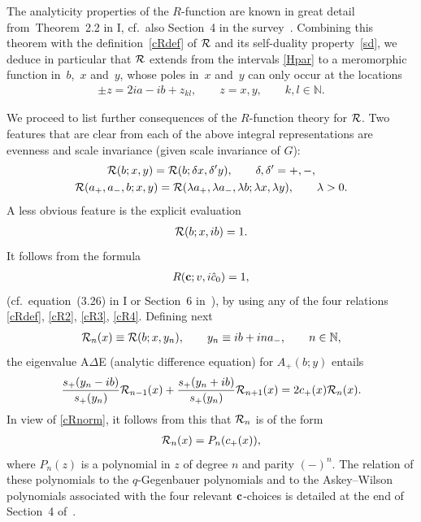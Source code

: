 \documentclass[11pt]{article}
\numberwithin{equation}{section}
\newcommand{\De}{\Delta}
\newcommand{\de}{\delta}
\newcommand{\N}{{\mathbb N}}
\newcommand{\cR}{{\cal R}}
\newcommand{\aaa}{a_{+},a_{-}}
\begin{document}
The analyticity properties of the $R$-function are known in great detail from~Theorem~2.2 in I, cf.~also Section~4 in the survey~\cite{Rsurv}. Combining this theorem with the def\/inition~\eqref{cRdef} of $\cR$ and its self-duality property~\eqref{sd}, we deduce in particular that $\cR$ extends from the intervals \eqref{Hpar} to a meromorphic function in~$b$,~$x$ and~$y$, whose poles in~$x$ and~$y$ can only occur at the locations
\begin{gather}\label{cRpoles}
\pm z=2ia-ib+z_{kl},\qquad  z=x,y,\qquad k,l\in \N.
\end{gather}

We proceed to list further consequences of the $R$-function theory for $\cR$. Two features that are clear from each of the above integral representations are evenness and scale invariance (given scale invariance of $G$):
\begin{gather}\label{even}
\cR (b;x,y)=\cR(b;\de x, \de'y),\qquad \de,\de'=+,-,
\\
\label{scale}
\cR(\aaa,b;x,y)=\cR(\lambda  a_{+},\lambda a_{-}, \lambda b;\lambda x,\lambda y),\qquad \lambda>0.
\end{gather}
A less obvious feature is the explicit evaluation
\begin{gather}\label{cRnorm}
\cR(b;x,ib)=1.
\end{gather}
It follows from the formula
\begin{gather}
R({\bf c};v,i\hat{c}_0)=1,
\end{gather}
(cf.~equation~(3.26) in I or Section~6 in~\cite{Rsurv}), by using any of the four relations \eqref{cRdef}, \eqref{cR2}, \eqref{cR3}, \eqref{cR4}.
Def\/ining next
\begin{gather}
\cR_n(x)\equiv \cR(b;x,y_n),\qquad y_n\equiv ib+ina_{-},\qquad n\in\N,
\end{gather}
the eigenvalue A$\De$E (analytic dif\/ference equation) for $A_{+}(b;y)$ entails
\begin{gather}
 \frac{s_{+}(y_n-ib)}{s_{+}(y_n)}\cR_{n-1}(x)+\frac{s_{+}(y_n+ib)}{s_{+}(y_n)}\cR_{n+1}(x)=2c_{+}(x)\cR_n(x).
\end{gather}
In view of \eqref{cRnorm}, it follows from this that $\cR_n$ is of the form
\begin{gather}\label{qGeg}
\cR_n(x)=P_n(c_{+}(x)),
\end{gather}
where $P_n(z)$ is a polynomial in $z$ of degree $n$ and parity $(-)^n$. The relation of these polynomials to the $q$-Gegenbauer polynomials and to the  Askey--Wilson polynomials associated with the four relevant ${\bf c}$-choices is detailed at the end of Section~4 of~\cite{quad}.
\end{document}
